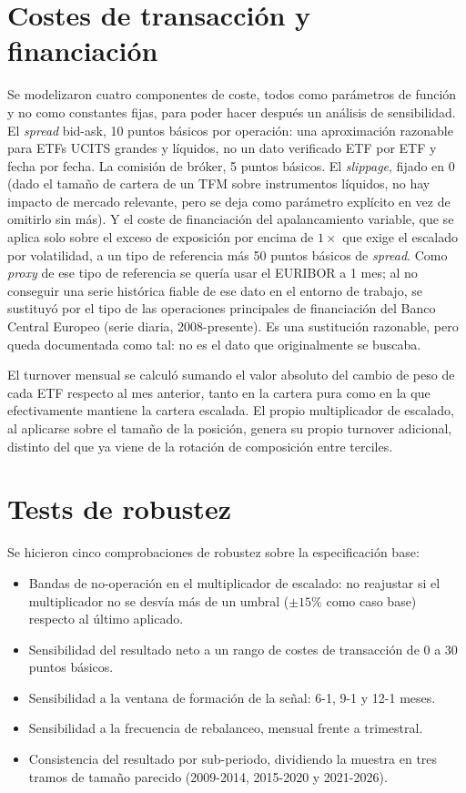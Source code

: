 \documentclass[12pt]{report} %
\begin{document}
\section{Costes de transacción y financiación}

Se modelizaron cuatro componentes de coste, todos como parámetros de función y no como constantes fijas, para poder hacer después un análisis de sensibilidad. El \textit{spread} bid-ask, 10 puntos básicos por operación: una aproximación razonable para ETFs UCITS grandes y líquidos, no un dato verificado ETF por ETF y fecha por fecha. La comisión de bróker, 5 puntos básicos. El \textit{slippage}, fijado en 0 (dado el tamaño de cartera de un TFM sobre instrumentos líquidos, no hay impacto de mercado relevante, pero se deja como parámetro explícito en vez de omitirlo sin más). Y el coste de financiación del apalancamiento variable, que se aplica solo sobre el exceso de exposición por encima de $1\times$ que exige el escalado por volatilidad, a un tipo de referencia más 50 puntos básicos de \textit{spread}. Como \textit{proxy} de ese tipo de referencia se quería usar el EURIBOR a 1 mes; al no conseguir una serie histórica fiable de ese dato en el entorno de trabajo, se sustituyó por el tipo de las operaciones principales de financiación del Banco Central Europeo (serie diaria, 2008-presente). Es una sustitución razonable, pero queda documentada como tal: no es el dato que originalmente se buscaba.

El turnover mensual se calculó sumando el valor absoluto del cambio de peso de cada ETF respecto al mes anterior, tanto en la cartera pura como en la que efectivamente mantiene la cartera escalada. El propio multiplicador de escalado, al aplicarse sobre el tamaño de la posición, genera su propio turnover adicional, distinto del que ya viene de la rotación de composición entre terciles.

\section{Tests de robustez}
\label{sec:robustez}

Se hicieron cinco comprobaciones de robustez sobre la especificación base:

\begin{itemize}
	\item Bandas de no-operación en el multiplicador de escalado: no reajustar si el multiplicador no se desvía más de un umbral ($\pm15\%$ como caso base) respecto al último aplicado.
	\item Sensibilidad del resultado neto a un rango de costes de transacción de 0 a 30 puntos básicos.
	\item Sensibilidad a la ventana de formación de la señal: 6-1, 9-1 y 12-1 meses.
	\item Sensibilidad a la frecuencia de rebalanceo, mensual frente a trimestral.
	\item Consistencia del resultado por sub-periodo, dividiendo la muestra en tres tramos de tamaño parecido (2009-2014, 2015-2020 y 2021-2026).
\end{itemize}
\end{document}

